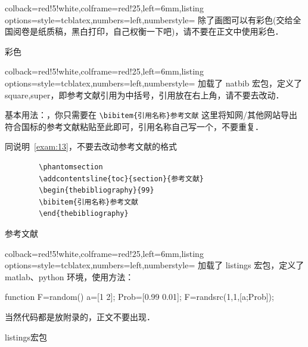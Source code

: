 \documentclass{JXUSTmodeling}
\begin{document}
\begin{example}[htbp]
    \centering
    \begin{tcblisting}{colback=red!5!white,colframe=red!25,left=6mm,listing options={style=tcblatex,numbers=left,numberstyle=\tiny\color{red!75!black}}}
    除了画图可以有彩色(交给全国阅卷是纸质稿，黑白打印，自己权衡一下吧)，请不要在正文中使用彩色．
\end{tcblisting}
    \caption{彩色}\label{exam:9}
\end{example}

\begin{example}[htbp]
    \centering
    \begin{tcblisting}{colback=red!5!white,colframe=red!25,left=6mm,listing options={style=tcblatex,numbers=left,numberstyle=\tiny\color{red!75!black}}}
    加载了 natbib 宏包，定义了 square,super，即参考文献引用为中括号，引用放在右上角，请不要去改动．

    基本用法：\cite{引用名称}，你只需要在 \verb|\bibitem{引用名称}参考文献| 这里将知网/其他网站导出符合国标的参考文献粘贴至此即可，引用名称自己写一个，不要重复．

    同说明~\ref{exam:13}，不要去改动参考文献的格式
    \begin{verbatim}
        \phantomsection
        \addcontentsline{toc}{section}{参考文献}
        \begin{thebibliography}{99}
        \bibitem{引用名称}参考文献
        \end{thebibliography}
    \end{verbatim}
\end{tcblisting}
    \caption{参考文献}\label{exam:11}
\end{example}

\begin{example}[htbp]
    \centering
    \begin{tcblisting}{colback=red!5!white,colframe=red!25,left=6mm,listing options={style=tcblatex,numbers=left,numberstyle=\tiny\color{red!75!black}}}
    加载了 listings 宏包，定义了 matlab、python 环境，使用方法：
    \begin{matlab}
function F=random()
a=[1 2];
Prob=[0.99 0.01];
F=randsrc(1,1,[a;Prob]);

    \end{matlab}
当然代码都是放附录的，正文不要出现．
\end{tcblisting}
    \caption{listings宏包}\label{exam:12}
\end{example}
\end{document}
